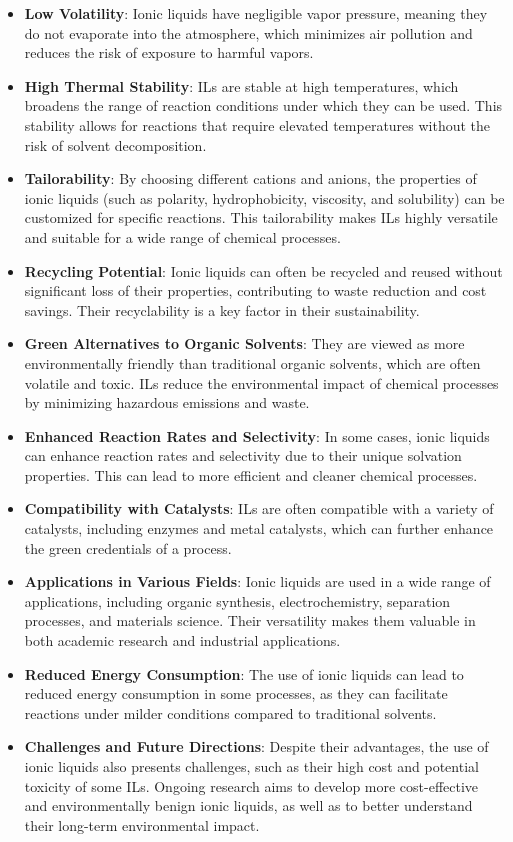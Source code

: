 \documentclass[11pt]{article}
\begin{document}
\begin{itemize}
    \item \textbf{Low Volatility}: Ionic liquids have negligible vapor pressure, meaning they do not evaporate into the atmosphere, which minimizes air pollution and reduces the risk of exposure to harmful vapors.
    \item \textbf{High Thermal Stability}: ILs are stable at high temperatures, which broadens the range of reaction conditions under which they can be used. This stability allows for reactions that require elevated temperatures without the risk of solvent decomposition.
    \item \textbf{Tailorability}: By choosing different cations and anions, the properties of ionic liquids (such as polarity, hydrophobicity, viscosity, and solubility) can be customized for specific reactions. This tailorability makes ILs highly versatile and suitable for a wide range of chemical processes.
    \item \textbf{Recycling Potential}: Ionic liquids can often be recycled and reused without significant loss of their properties, contributing to waste reduction and cost savings. Their recyclability is a key factor in their sustainability.
    \item \textbf{Green Alternatives to Organic Solvents}: They are viewed as more environmentally friendly than traditional organic solvents, which are often volatile and toxic. ILs reduce the environmental impact of chemical processes by minimizing hazardous emissions and waste.
    \item \textbf{Enhanced Reaction Rates and Selectivity}: In some cases, ionic liquids can enhance reaction rates and selectivity due to their unique solvation properties. This can lead to more efficient and cleaner chemical processes.
    \item \textbf{Compatibility with Catalysts}: ILs are often compatible with a variety of catalysts, including enzymes and metal catalysts, which can further enhance the green credentials of a process.
    \item \textbf{Applications in Various Fields}: Ionic liquids are used in a wide range of applications, including organic synthesis, electrochemistry, separation processes, and materials science. Their versatility makes them valuable in both academic research and industrial applications.
    \item \textbf{Reduced Energy Consumption}: The use of ionic liquids can lead to reduced energy consumption in some processes, as they can facilitate reactions under milder conditions compared to traditional solvents.
    \item \textbf{Challenges and Future Directions}: Despite their advantages, the use of ionic liquids also presents challenges, such as their high cost and potential toxicity of some ILs. Ongoing research aims to develop more cost-effective and environmentally benign ionic liquids, as well as to better understand their long-term environmental impact.
\end{itemize}
\end{document}
